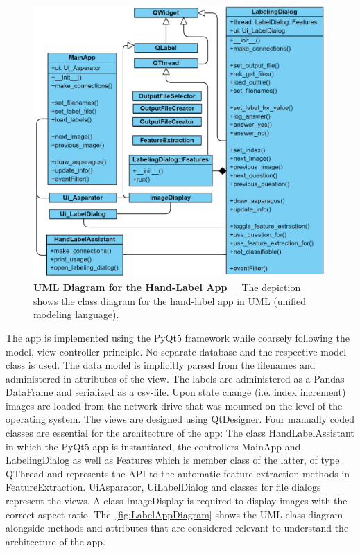 \begin{figure}[h]
	\centering
	\includegraphics[scale=0.3]{Figures/chapter03/label_app_diagram.png}
	\decoRule
	\caption[UML Diagram for the Hand-Label App]{\textbf{UML Diagram for the Hand-Label App}~~~The depiction shows the class diagram for the hand-label app in UML (unified modeling language).}
	\label{fig:LabelAppDiagram}
\end{figure}

The app is implemented using the PyQt5 framework while coarsely following the model, view controller principle. No separate database and the respective model class is used. The data model is implicitly parsed from the filenames and administered in attributes of the view. The labels are administered as a Pandas DataFrame and serialized as a csv-file. Upon state change (i.e. index increment) images are loaded from the network drive that was mounted on the level of the operating system. The views are designed using QtDesigner. Four manually coded classes are essential for the architecture of the app: The class HandLabelAssistant in which the PyQt5 app is instantiated, the controllers MainApp and LabelingDialog as well as Features which is member class of the latter, of type QThread and represents the API to the automatic feature extraction methods in FeatureExtraction. Ui\textunderscore Asparator, UiLabelDialog and classes for file dialogs represent the views. A class ImageDisplay is required to display images with the correct aspect ratio. The~\autoref{fig:LabelAppDiagram} shows the UML class diagram alongside methods and attributes that are considered relevant to understand the architecture of the app. 

